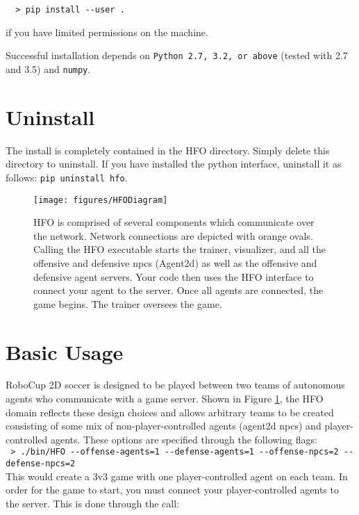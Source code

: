 \documentclass[12pt]{article}
\begin{document}
\noindent \verb+  > pip install --user .+

if you have limited permissions on the machine.

Successful installation depends on
\verb+Python 2.7, 3.2, or above+ (tested with 2.7 and 3.5) and \verb+numpy+.

\section{Uninstall}

The install is completely contained in the HFO directory. Simply
delete this directory to uninstall. If you have installed the python
interface, uninstall it as follows: \verb+pip uninstall hfo+.

\begin{figure}[htp]
  \centering
  \texttt{[image: figures/HFODiagram]}
  \caption{HFO is comprised of several components which communicate
    over the network. Network connections are depicted with orange
    ovals. Calling the HFO executable starts the trainer, visualizer,
    and all the offensive and defensive npcs (Agent2d) as well as the
    offensive and defensive agent servers. Your code then uses the HFO
    interface to connect your agent to the server. Once all agents are
    connected, the game begins. The trainer oversees the game.}
  \label{fig:hfo}
\end{figure}

\section{Basic Usage}

RoboCup 2D soccer is designed to be played between two teams of
autonomous agents who communicate with a game server. Shown in Figure
\ref{fig:hfo}, the HFO domain reflects these design choices and allows
arbitrary teams to be created consisting of some mix of
non-player-controlled agents (agent2d npcs) and player-controlled
agents. These options are specified through the following flags:\\

\noindent
\verb+ > ./bin/HFO --offense-agents=1 --defense-agents=1 --offense-npcs=2 --defense-npcs=2+\\

This would create a 3v3 game with one player-controlled agent on each
team. In order for the game to start, you must connect your
player-controlled agents to the server. This is done through the
call:\\
\end{document}
